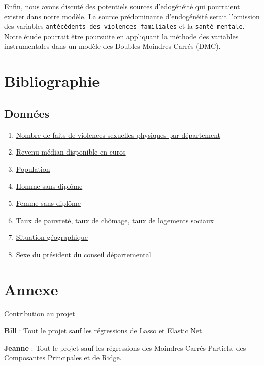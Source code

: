 \documentclass[
]{article}
\begin{document}
Enfin, nous avons discuté des potentiels sources d'edogénéité qui
pourraient exister dans notre modèle. La source prédominante
d'endogénéité serait l'omission des variables
\texttt{antécédents\ des\ violences\ familiales} et la
\texttt{santé\ mentale}. Notre étude pourrait être poursuite en
appliquant la méthode des variables instrumentales dans un modèle des
Doubles Moindres Carrés (DMC).

\newpage

\hypertarget{bibliographie}{%
\section{Bibliographie}\label{bibliographie}}

\hypertarget{donnuxe9es}{%
\subsection{Données}\label{donnuxe9es}}

\begin{enumerate}
\def\labelenumi{\arabic{enumi}.}
\item
  \href{https://www.data.gouv.fr/fr/datasets/bases-communale-et-departementale-des-principaux-indicateurs-des-crimes-et-delits-enregistres-par-la-police-et-la-gendarmerie-nationales/}{Nombre
  de faits de violences sexuelles physiques par département}
\item
  \href{https://www.observatoire-des-territoires.gouv.fr/mediane-du-revenu-disponible-par-uc}{Revenu
  médian disponible en euros}
\item
  \href{https://www.data.gouv.fr/fr/datasets/bases-communale-et-departementale-des-principaux-indicateurs-des-crimes-et-delits-enregistres-par-la-police-et-la-gendarmerie-nationales/}{Population}
\item
  \href{https://www.insee.fr/fr/statistiques/1893149}{Homme sans
  diplôme}
\item
  \href{https://www.insee.fr/fr/statistiques/1893149}{Femme sans
  diplôme}
\item
  \href{https://www.data.gouv.fr/fr/datasets/logements-et-logements-sociaux-dans-les-departements-1/}{Taux
  de pauvreté, taux de chômage, taux de logements sociaux}
\item
  \href{http://www.cartesfrance.fr/carte-france-departement/carte-france-departements.html}{Situation
  géographique}
\item
  \href{https://www.regions-departements-france.fr/pdf/departements/liste-des-presidents-de-departement-2020.pdf}{Sexe
  du président du conseil départemental}
\end{enumerate}

\newpage

\hypertarget{annexe}{%
\section{Annexe}\label{annexe}}

Contribution au projet

\textbf{Bill} : Tout le projet sauf les régressions de Lasso et Elastic
Net.

\textbf{Jeanne} : Tout le projet sauf les régressions des Moindres
Carrés Partiels, des Composantes Principales et de Ridge.
\end{document}
